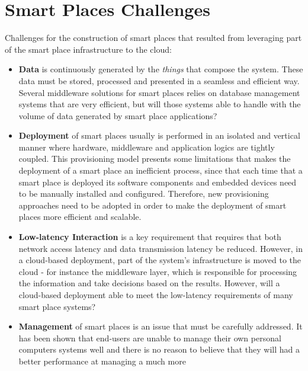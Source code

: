 \section{Smart Places Challenges}
\label{section:challenges}
Challenges \cite{caceres2012ubicomp} for the construction of smart places that resulted from leveraging
part of the smart place infrastructure to the cloud:\\

\begin{itemize}
  \item \textbf{Data} is continuously generated by the \textit{things} that compose the system.
  These data must be stored, processed and presented in a seamless and efficient way. Several
  middleware solutions for smart places \cite{floerkemeier2007rfid}\cite{eisenhauer2010hydra}\cite{de2008socrades}
  relies on database management systems that are very efficient, but will those systems able to
  handle with the volume of data generated by smart place applications?
  \item \textbf{Deployment} of smart places usually is performed in an isolated and vertical manner
  where hardware, middleware and application logics are tightly coupled. This provisioning model presents
  some limitations that makes the deployment of a smart place an inefficient process, since that each
  time that a smart place is deployed its software components and embedded devices need to be manually
  installed and configured. Therefore, new provisioning approaches need to be adopted in order to make
  the deployment of smart places more efficient and scalable.
  \item \textbf{Low-latency Interaction} is a key requirement that requires that both network access
  latency and data transmission latency be reduced. However, in a cloud-based deployment, part of the
  system's infrastructure is moved to the cloud - for instance the middleware layer, which is responsible
  for processing the information and take decisions based on the results. However, will a cloud-based
  deployment able to meet the low-latency requirements of many smart place systems?
  \item \textbf{Management} of smart places is an issue that must be carefully addressed. It has been
  shown that end-users are unable to manage their own personal computers systems well \cite{doll1988measurement}
  and there is no reason to believe that they will had a better performance at managing a much more

\end{itemize}
